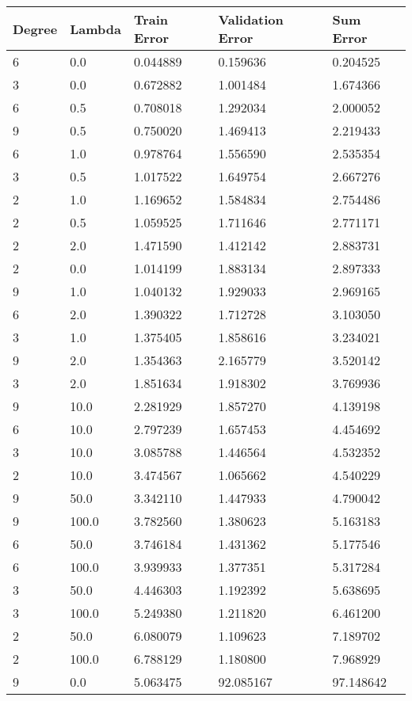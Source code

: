 \def\arraystretch{1.25}
\begin{center}
\begin{longtable}{l l l l l}
\hline
\hline
\textbf{Degree} & \textbf{Lambda} & \textbf{Train Error} & \textbf{Validation Error} & \textbf{Sum Error}\\
\hline
\hline
6 & 0.0 & 0.044889 & 0.159636 & 0.204525 \\
3 & 0.0 & 0.672882 & 1.001484 & 1.674366 \\
6 & 0.5 & 0.708018 & 1.292034 & 2.000052 \\
9 & 0.5 & 0.750020 & 1.469413 & 2.219433 \\
6 & 1.0 & 0.978764 & 1.556590 & 2.535354 \\
3 & 0.5 & 1.017522 & 1.649754 & 2.667276 \\
2 & 1.0 & 1.169652 & 1.584834 & 2.754486 \\
2 & 0.5 & 1.059525 & 1.711646 & 2.771171 \\
2 & 2.0 & 1.471590 & 1.412142 & 2.883731 \\
2 & 0.0 & 1.014199 & 1.883134 & 2.897333 \\
9 & 1.0 & 1.040132 & 1.929033 & 2.969165 \\
6 & 2.0 & 1.390322 & 1.712728 & 3.103050 \\
3 & 1.0 & 1.375405 & 1.858616 & 3.234021 \\
9 & 2.0 & 1.354363 & 2.165779 & 3.520142 \\
3 & 2.0 & 1.851634 & 1.918302 & 3.769936 \\
9 & 10.0 & 2.281929 & 1.857270 & 4.139198 \\
6 & 10.0 & 2.797239 & 1.657453 & 4.454692 \\
3 & 10.0 & 3.085788 & 1.446564 & 4.532352 \\
2 & 10.0 & 3.474567 & 1.065662 & 4.540229 \\
9 & 50.0 & 3.342110 & 1.447933 & 4.790042 \\
9 & 100.0 & 3.782560 & 1.380623 & 5.163183 \\
6 & 50.0 & 3.746184 & 1.431362 & 5.177546 \\
6 & 100.0 & 3.939933 & 1.377351 & 5.317284 \\
3 & 50.0 & 4.446303 & 1.192392 & 5.638695 \\
3 & 100.0 & 5.249380 & 1.211820 & 6.461200 \\
2 & 50.0 & 6.080079 & 1.109623 & 7.189702 \\
2 & 100.0 & 6.788129 & 1.180800 & 7.968929 \\
9 & 0.0 & 5.063475 & 92.085167 & 97.148642 \\
\hline
\end{longtable}
\setcounter{table}{0}
\end{center}